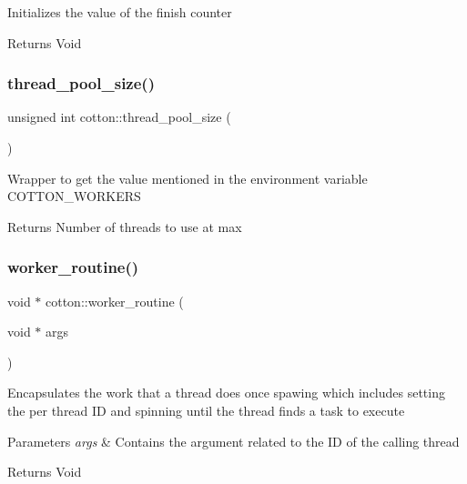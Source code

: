 Initializes the value of the finish counter

\begin{DoxyReturn}{Returns}
Void 
\end{DoxyReturn}
\mbox{\label{namespacecotton_a0b32dd3b6a3d126e107d5c77ec1f4cc3}} 
\subsubsection{\texorpdfstring{thread\+\_\+pool\+\_\+size()}{thread\_pool\_size()}}
{\footnotesize\ttfamily unsigned int cotton\+::thread\+\_\+pool\+\_\+size (\begin{DoxyParamCaption}{ }\end{DoxyParamCaption})}

Wrapper to get the value mentioned in the environment variable C\+O\+T\+T\+O\+N\+\_\+\+W\+O\+R\+K\+E\+RS

\begin{DoxyReturn}{Returns}
Number of threads to use at max 
\end{DoxyReturn}
\mbox{\label{namespacecotton_a361c34063ecb68cf02d417074decb12b}} 
\subsubsection{\texorpdfstring{worker\+\_\+routine()}{worker\_routine()}}
{\footnotesize\ttfamily void $\ast$ cotton\+::worker\+\_\+routine (\begin{DoxyParamCaption}\item[{void $\ast$}]{args }\end{DoxyParamCaption})}

Encapsulates the work that a thread does once spawing which includes setting the per thread ID and spinning until the thread finds a task to execute


\begin{DoxyParams}{Parameters}
{\em args} & Contains the argument related to the ID of the calling thread \\
\hline
\end{DoxyParams}
\begin{DoxyReturn}{Returns}
Void 
\end{DoxyReturn}
